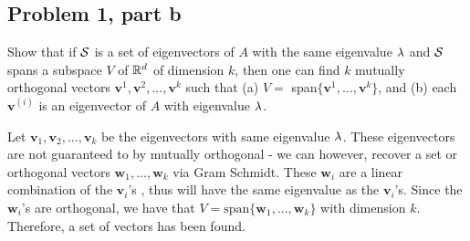 \subsection{Problem 1, part b}
Show that if $\mathcal{S}$ is a set of eigenvectors of $A$ with the same eigenvalue $\mathrm{\lambda}$ and $\mathcal{S}$ spans a subspace $V$ of $\mathbb{R}^d$ of dimension $k$, then one can find $k$ mutually orthogonal vectors $\textbf{v}^1, \textbf{v}^2, ..., \textbf{v}^k$ such that (a) $V =$ span$\{ \textbf{v}^1, ..., \textbf{v}^k\}$, and (b) each $\textbf{v}^{(i)}$ is an eigenvector of $A$ with eigenvalue $\mathrm{\lambda}$. 
\partbreak
\begin{solution}

    Let $\textbf{v}_1, \textbf{v}_2, ..., \textbf{v}_k$ be the eigenvectors with same eigenvalue $\mathrm{\lambda}$. These eigenvectors are not guaranteed to by mutually orthogonal - we can however, recover a set or orthogonal vectors $\textbf{w}_1, ..., \textbf{w}_k$ via Gram Schmidt. These $\textbf{w}_i$ are a linear combination of the $\textbf{v}_i$'s , thus will have the same eigenvalue as the $\textbf{v}_i$'s. Since the $\textbf{w}_i$'s are orthogonal, we have that $V = \text{span}\{\textbf{w}_1, ..., \textbf{w}_k\}$ with dimension $k$. Therefore, a set of vectors has been found.  
\end{solution}


\newpage
